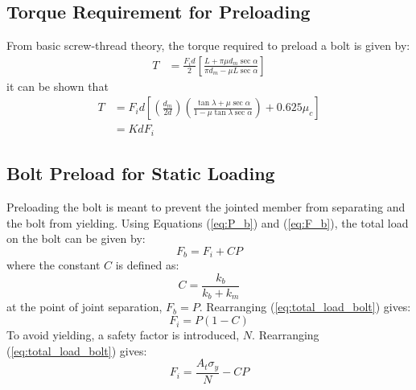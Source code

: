 \subsection{Torque Requirement for Preloading}
\label{sec:torque_for_preloading}
From basic screw-thread theory, the torque required to preload a bolt is given by:
\begin{align*}
    T &= \frac{F_i d}{2}\left[\frac{L + \pi \mu d_m \sec\alpha}{\pi d_m - \mu L \sec\alpha}\right] 
\end{align*}
it can be shown that 
\begin{align}
    T &= F_i d \left[ \left(\frac{d_m}{2d}\right)\left(\frac{\tan\lambda + \mu \sec\alpha}{1 - \mu \tan\lambda \sec\alpha}\right) + 0.625\mu_c \right]  \nonumber \\
    &= KdF_i \label{eq:torque_constant}
\end{align}

\subsection{Bolt Preload for Static Loading}
Preloading the bolt is meant to prevent the jointed member from separating and the bolt from yielding. Using Equations (\ref{eq:P_b}) and (\ref{eq:F_b}), the total load on the bolt can be given by:
\begin{equation}
    F_b = F_i + CP \label{eq:total_load_bolt}
\end{equation}
where the constant $C$ is defined as:
\begin{equation}
    C = \frac{k_b}{k_b+k_m} \label{eq:constant_C}
\end{equation}
at the point of joint separation, $F_b = P$. Rearranging (\ref{eq:total_load_bolt}) gives:
\begin{equation}
    F_i = P(1-C) \label{eq:joint_separation}
\end{equation}
To avoid yielding, a safety factor is introduced, $N$. Rearranging (\ref{eq:total_load_bolt}) gives:
\begin{equation}
    F_i = \frac{A_t \sigma_{y}}{N} - CP \label{eq:yielding}
\end{equation}

